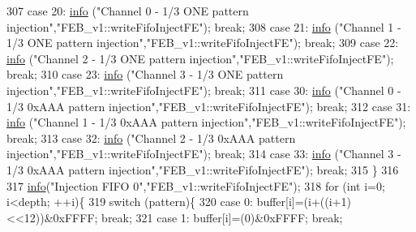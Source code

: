 \begin{DoxyCode}
307   \textcolor{keywordflow}{case} 20:  \hyperlink{classObject_a644fd329ea4cb85f54fa6846484b84a8}{info} (\textcolor{stringliteral}{"Channel 0 - 1/3 ONE pattern injection"},\textcolor{stringliteral}{"FEB\_v1::writeFifoInjectFE"}); \textcolor{keywordflow}{break};
308   \textcolor{keywordflow}{case} 21:  \hyperlink{classObject_a644fd329ea4cb85f54fa6846484b84a8}{info} (\textcolor{stringliteral}{"Channel 1 - 1/3 ONE pattern injection"},\textcolor{stringliteral}{"FEB\_v1::writeFifoInjectFE"}); \textcolor{keywordflow}{break};
309   \textcolor{keywordflow}{case} 22:  \hyperlink{classObject_a644fd329ea4cb85f54fa6846484b84a8}{info} (\textcolor{stringliteral}{"Channel 2 - 1/3 ONE pattern injection"},\textcolor{stringliteral}{"FEB\_v1::writeFifoInjectFE"}); \textcolor{keywordflow}{break};
310   \textcolor{keywordflow}{case} 23:  \hyperlink{classObject_a644fd329ea4cb85f54fa6846484b84a8}{info} (\textcolor{stringliteral}{"Channel 3 - 1/3 ONE pattern injection"},\textcolor{stringliteral}{"FEB\_v1::writeFifoInjectFE"}); \textcolor{keywordflow}{break};
311   \textcolor{keywordflow}{case} 30:  \hyperlink{classObject_a644fd329ea4cb85f54fa6846484b84a8}{info} (\textcolor{stringliteral}{"Channel 0 - 1/3 0xAAA pattern injection"},\textcolor{stringliteral}{"FEB\_v1::writeFifoInjectFE"}); \textcolor{keywordflow}{break};
312   \textcolor{keywordflow}{case} 31:  \hyperlink{classObject_a644fd329ea4cb85f54fa6846484b84a8}{info} (\textcolor{stringliteral}{"Channel 1 - 1/3 0xAAA pattern injection"},\textcolor{stringliteral}{"FEB\_v1::writeFifoInjectFE"}); \textcolor{keywordflow}{break};
313   \textcolor{keywordflow}{case} 32:  \hyperlink{classObject_a644fd329ea4cb85f54fa6846484b84a8}{info} (\textcolor{stringliteral}{"Channel 2 - 1/3 0xAAA pattern injection"},\textcolor{stringliteral}{"FEB\_v1::writeFifoInjectFE"}); \textcolor{keywordflow}{break};
314   \textcolor{keywordflow}{case} 33:  \hyperlink{classObject_a644fd329ea4cb85f54fa6846484b84a8}{info} (\textcolor{stringliteral}{"Channel 3 - 1/3 0xAAA pattern injection"},\textcolor{stringliteral}{"FEB\_v1::writeFifoInjectFE"}); \textcolor{keywordflow}{break};
315   \}
316 
317   \hyperlink{classObject_a644fd329ea4cb85f54fa6846484b84a8}{info}(\textcolor{stringliteral}{"Injection FIFO 0"},\textcolor{stringliteral}{"FEB\_v1::writeFifoInjectFE"});        
318   \textcolor{keywordflow}{for} (\textcolor{keywordtype}{int} i=0; i<depth; ++i)\{
319     \textcolor{keywordflow}{switch} (pattern)\{
320     \textcolor{keywordflow}{case} 0: buffer[i]=(i+((i+1)<<12))&0xFFFF; \textcolor{keywordflow}{break};
321     \textcolor{keywordflow}{case} 1:   buffer[i]=(0)&0xFFFF; \textcolor{keywordflow}{break};

\end{DoxyCode}
